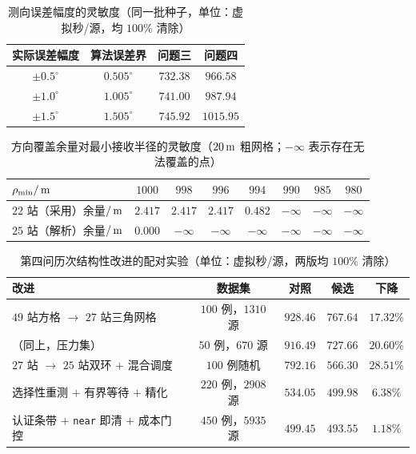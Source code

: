 \begin{appendices}
\begin{table}[!htbp]
  \caption{测向误差幅度的灵敏度（同一批种子，单位：虚拟秒/源，均 $100\%$ 清除）}\label{tab:senserr}\centering
  \begin{tabular}{cccc}
    \toprule[1.5pt]
    实际误差幅度 & 算法误差界 & 问题三 & 问题四 \\
    \midrule[1pt]
    $\pm0.5^\circ$ & $0.505^\circ$ & $732.38$ & $966.58$ \\
    $\pm1.0^\circ$ & $1.005^\circ$ & $741.00$ & $987.94$ \\
    $\pm1.5^\circ$ & $1.505^\circ$ & $745.92$ & $1015.95$ \\
    \bottomrule[1.5pt]
  \end{tabular}
\end{table}

\begin{table}[!htbp]
  \caption{方向覆盖余量对最小接收半径的灵敏度（$20\,\mathrm{m}$ 粗网格；$-\infty$ 表示存在无法覆盖的点）}\label{tab:sensrho}\centering
  \begin{tabular}{lccccccc}
    \toprule[1.5pt]
    $\rho_{\min}/\,\mathrm{m}$ & $1000$ & $998$ & $996$ & $994$ & $990$ & $985$ & $980$ \\
    \midrule[1pt]
    $22$ 站（采用）余量$/\,\mathrm{m}$ & $2.417$ & $2.417$ & $2.417$ & $0.482$ & $-\infty$ & $-\infty$ & $-\infty$ \\
    $25$ 站（解析）余量$/\,\mathrm{m}$ & $0.000$ & $-\infty$ & $-\infty$ & $-\infty$ & $-\infty$ & $-\infty$ & $-\infty$ \\
    \bottomrule[1.5pt]
  \end{tabular}
\end{table}

\begin{table}[!htbp]
  \caption{第四问历次结构性改进的配对实验（单位：虚拟秒/源，两版均 $100\%$ 清除）}\label{tab:q4paired}\centering
  \begin{tabular}{lcccc}
    \toprule[1.5pt]
    改进 & 数据集 & 对照 & 候选 & 下降 \\
    \midrule[1pt]
    $49$ 站方格 $\to$ $27$ 站三角网格 & $100$ 例，$1310$ 源 & $928.46$ & $767.64$ & $17.32\%$ \\
    （同上，压力集） & $50$ 例，$670$ 源 & $916.49$ & $727.66$ & $20.60\%$ \\
    $27$ 站 $\to$ $25$ 站双环 $+$ 混合调度 & $100$ 例随机 & $792.16$ & $566.30$ & $28.51\%$ \\
    选择性重测 $+$ 有界等待 $+$ 精化 & $220$ 例，$2908$ 源 & $534.05$ & $499.98$ & $6.38\%$ \\
    认证条带 $+$ \texttt{near} 即清 $+$ 成本门控 & $450$ 例，$5935$ 源 & $499.45$ & $493.55$ & $1.18\%$ \\
    \bottomrule[1.5pt]
  \end{tabular}
\end{table}


\end{appendices}
